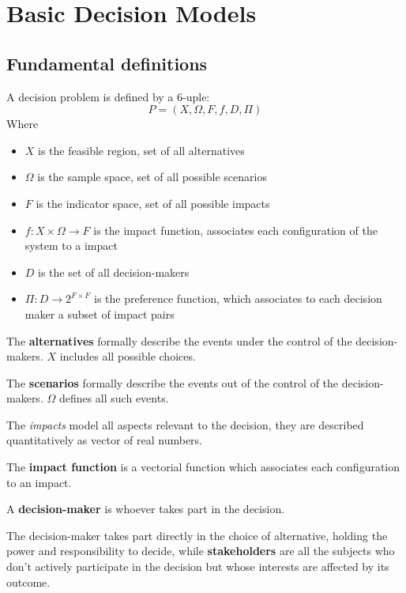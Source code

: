 \section{Basic Decision Models}

\subsection{Fundamental definitions}

A decision problem is defined by a 6-uple: 
$$ P = (X, \Omega, F, f, D, \Pi)$$
Where
\begin{itemize}
	\item $X$ is the feasible region, set of all alternatives
	
	\item $\Omega$ is the sample space, set of all possible scenarios
	
	\item $F$ is the indicator space, set of all possible impacts 
	
	\item $f: X \times \Omega \rightarrow F$ is the impact function, associates each configuration of the system to a impact
	
	\item $D$ is the set of all decision-makers
	
	\item $\Pi: D \rightarrow 2^{F \times F}$ is the preference function, which associates to each decision maker a subset of impact pairs
\end{itemize}

The \textbf{alternatives} formally describe the events under the control of the decision-makers. $X$ includes all possible choices.

The \textbf{scenarios} formally describe the events out of the control of the decision-makers. $\Omega$ defines all such events.

The \textit{impacts} model all aspects relevant to the decision, they are described quantitatively as vector of real numbers.

The \textbf{impact function} is a vectorial function which associates each configuration to an impact.

A \textbf{decision-maker} is whoever takes part in the decision. 

The decision-maker takes part directly in the choice of alternative, holding the power and responsibility to decide, while \textbf{stakeholders} are all the subjects who don't actively participate in the decision but whose interests are affected by its outcome.

